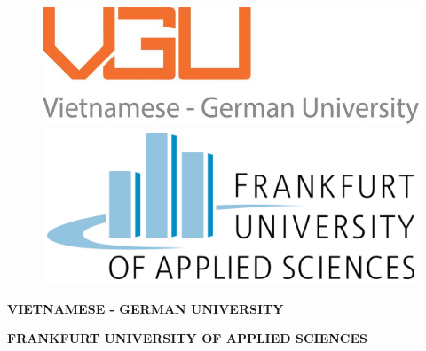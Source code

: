 \documentclass[12pt,twoside]{report}
\begin{document}
\begin{titlepage}
  \begin{center}

  \begin{figure}[htbp]
    \begin{minipage}{0.5\linewidth}
    \centering
    \includegraphics[width=\textwidth]{vgu_logo.jpg}
    \end{minipage}
    \hfill{\hspace{2cm}}
    \begin{minipage}{0.4\textwidth}
    \centering
    \includegraphics[width=\textwidth]{FRA-UAS.png}
    \end{minipage}
    \end{figure}

    \vspace*{1cm}

    \textbf{\large \uppercase{vietnamese - german university}}

    \vspace*{0.5cm}

    \textbf{\large \uppercase{Frankfurt university of applied sciences}}

    \vspace*{0.5cm}


\end{center}
\end{titlepage}
\end{document}
